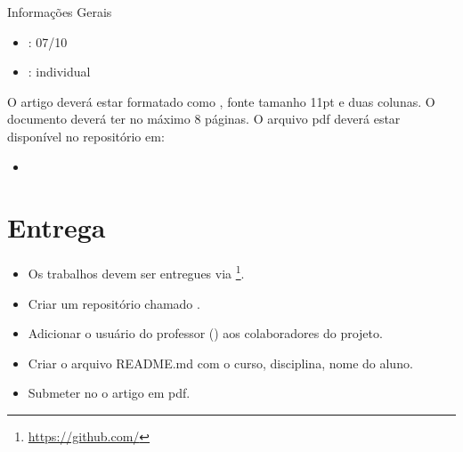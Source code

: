 \documentclass[a4paper,11pt]{karticle}
\begin{document}
\begin{info}{Informações Gerais}
\begin{itemize}
  \item {}: 07/10
  \item {}: individual
\end{itemize}
\end{info}

O artigo deverá estar formatado como , fonte tamanho 11pt e duas colunas. O documento deverá ter no máximo 8 páginas. O arquivo pdf deverá estar disponível no repositório em: 

\begin{itemize}
  \item {}
\end{itemize}


\section*{Entrega}

\begin{itemize}
    \item Os trabalhos devem ser entregues via \footnote{\url{https://github.com/}}.
    \item Criar um repositório chamado .
    \item Adicionar o usuário do professor () aos colaboradores do projeto.
    \item Criar o arquivo README.md com o curso, disciplina, nome do aluno.
    \item Submeter no  o artigo em pdf. 
\end{itemize}
\end{document}
